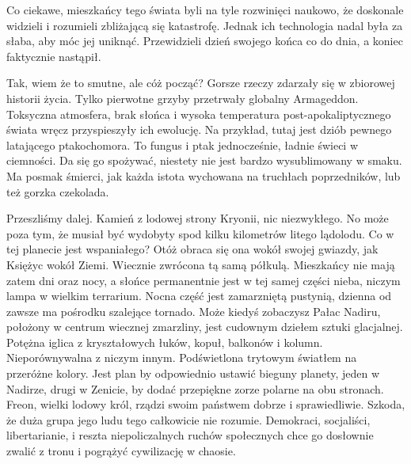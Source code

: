 Co ciekawe, mieszkańcy tego świata byli na tyle rozwinięci naukowo, że doskonale widzieli i rozumieli zbliżającą się katastrofę.
Jednak ich technologia nadal była za słaba, aby móc jej uniknąć.
Przewidzieli dzień swojego końca co do dnia, a koniec faktycznie nastąpił.

Tak, wiem że to smutne, ale cóż począć? Gorsze rzeczy zdarzały się w zbiorowej historii życia. 
Tylko pierwotne grzyby przetrwały globalny Armageddon.
Toksyczna atmosfera, brak słońca i wysoka temperatura post-apokaliptycznego świata wręcz przyspieszyły ich ewolucję.
Na przykład, tutaj jest dziób pewnego latającego ptakochomora. To fungus i ptak jednocześnie, ładnie świeci w ciemności.
Da się go spożywać, niestety nie jest bardzo wysublimowany w smaku. 
Ma posmak śmierci, jak każda istota wychowana na truchłach poprzedników, lub też gorzka czekolada.

Przeszliśmy dalej. Kamień z lodowej strony Kryonii, nic niezwykłego. 
No może poza tym, że musiał być wydobyty spod kilku kilometrów litego lądolodu.
Co w tej planecie jest wspaniałego? Otóż obraca się ona wokół swojej gwiazdy, jak Księżyc wokół Ziemi. 
Wiecznie zwrócona tą samą półkulą.
Mieszkańcy nie mają zatem dni oraz nocy, a słońce permanentnie jest w tej samej części nieba, niczym lampa w wielkim terrarium.
Nocna część jest zamarzniętą pustynią, dzienna od zawsze ma pośrodku szalejące tornado.
Może kiedyś zobaczysz Pałac Nadiru, położony w centrum wiecznej zmarzliny, jest cudownym dziełem sztuki glacjalnej.
Potężna iglica z kryształowych łuków, kopuł, balkonów i kolumn. Nieporównywalna z niczym innym.
Podświetlona trytowym światłem na przeróżne kolory. 
Jest plan by odpowiednio ustawić bieguny planety, jeden w Nadirze, drugi w Zenicie, by dodać przepiękne zorze polarne na obu stronach.
Freon, wielki lodowy król, rządzi swoim państwem dobrze i sprawiedliwie.
Szkoda, że duża grupa jego ludu tego całkowicie nie rozumie. 
Demokraci, socjaliści, libertarianie, i reszta niepoliczalnych ruchów społecznych chce go dosłownie zwalić z tronu i pogrążyć cywilizację w chaosie.

